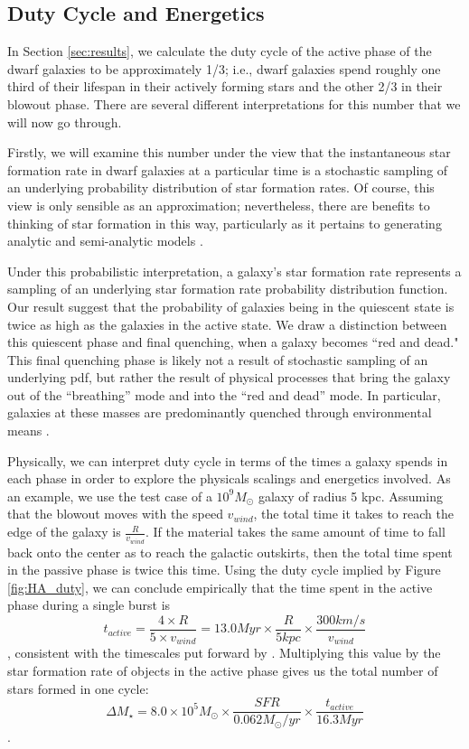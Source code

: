 \documentclass[iop]{emulateapj}
\begin{document}
\subsection{Duty Cycle and Energetics}

In Section \ref{sec:results}, we calculate the duty cycle of the active phase of the dwarf galaxies to be approximately 1/3; i.e., dwarf galaxies spend roughly one third of their lifespan in their actively forming stars and the other 2/3 in their blowout phase. There are several different interpretations for this number that we will now go through.

Firstly, we will examine this number under the view that the instantaneous star formation rate in dwarf galaxies at a particular time is a stochastic sampling of an underlying probability distribution of star formation rates. Of course, this view is only sensible as an approximation; nevertheless, there are benefits to thinking of star formation in this way, particularly as it pertains to generating analytic and semi-analytic models \citep{Kelson16}. 

Under this probabilistic interpretation, a galaxy's star formation rate represents a sampling of an underlying star formation rate probability distribution function. Our result suggest that the probability of galaxies being in the quiescent state is twice as high as the galaxies in the active state. We draw a distinction between this quiescent phase and final quenching, when a galaxy becomes ``red and dead." This final quenching phase is likely not a result of stochastic sampling of an underlying pdf, but rather the result of physical processes that bring the galaxy out of the ``breathing'' mode and into the ``red and dead'' mode. In particular, galaxies at these masses are predominantly quenched through environmental means \citep{geha12}.

Physically, we can interpret duty cycle in terms of the times a galaxy spends in each phase in order to explore the physicals scalings and energetics involved. As an example, we use the test case of a $10^9 M_{\odot}$ galaxy of radius 5 kpc. Assuming that the blowout moves with the speed $v_{wind}$, the total time it takes to reach the edge of the galaxy is $\frac{R}{v_{wind}}$. If the material takes the same amount of time to fall back onto the center as to reach the galactic outskirts, then the total time spent in the passive phase is twice this time. Using the duty cycle implied by Figure \ref{fig:HA_duty}, we can conclude empirically that the time spent in the active phase during a single burst is $$t_{active} = \frac{4 \times R}{5 \times v_{wind}} = 13.0 Myr \times \frac{R}{5 kpc}\times \frac{300 km/s}{v_{wind}}  $$, consistent with the timescales put forward by \cite{EB17}. Multiplying this value by the star formation rate of objects in the active phase gives us the total number of stars formed in one cycle:
$$\Delta M_{\star} = 8.0 \times 10^5 M_{\odot} \times \frac{SFR}{0.062 M_{\odot}/yr} \times \frac{t_{active}}{16.3 Myr}$$.
\end{document}
